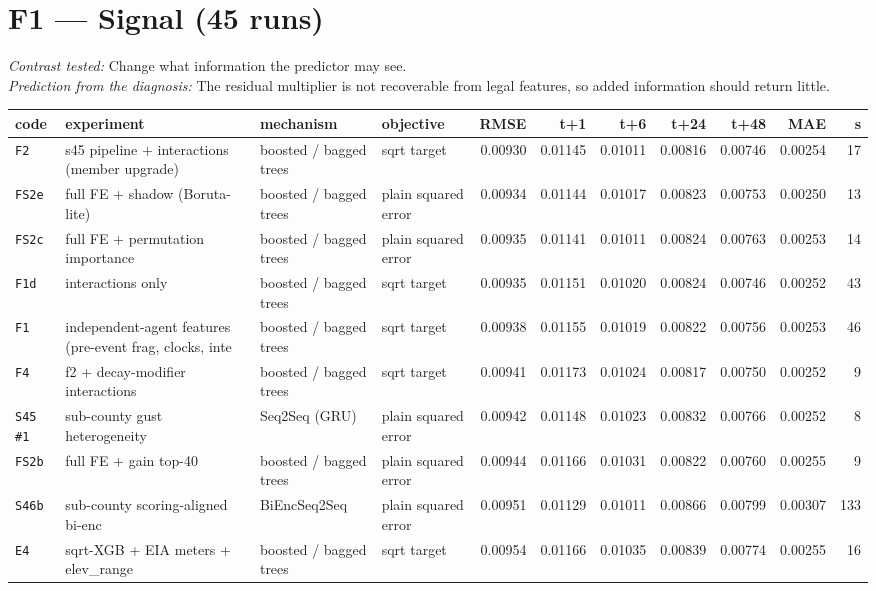 \documentclass[9pt,landscape]{article}
\begin{document}
\section*{F1 --- Signal (45 runs)}
\noindent\emph{Contrast tested:} Change what information the predictor may see.\\
\emph{Prediction from the diagnosis:} The residual multiplier is not recoverable from legal features, so added information should return little.
\vspace{2pt}
\begin{longtable}{@{}p{1.1cm}p{5.4cm}p{3.1cm}p{2.7cm}rrrrrrr@{}}
\toprule code & experiment & mechanism & objective & RMSE & t+1 & t+6 & t+24 & t+48 & MAE & s \\ \midrule \endhead
\rowcolor{gray!15}\texttt{F2} & s45 pipeline + interactions (member upgrade) & boosted / bagged trees & sqrt target & 0.00930 & 0.01145 & 0.01011 & 0.00816 & 0.00746 & 0.00254 & 17 \\
\texttt{FS2e} & full FE + shadow (Boruta-lite) & boosted / bagged trees & plain squared error & 0.00934 & 0.01144 & 0.01017 & 0.00823 & 0.00753 & 0.00250 & 13 \\
\texttt{FS2c} & full FE + permutation importance & boosted / bagged trees & plain squared error & 0.00935 & 0.01141 & 0.01011 & 0.00824 & 0.00763 & 0.00253 & 14 \\
\texttt{F1d} & interactions only & boosted / bagged trees & sqrt target & 0.00935 & 0.01151 & 0.01020 & 0.00824 & 0.00746 & 0.00252 & 43 \\
\texttt{F1} & independent-agent features (pre-event frag, clocks, inte & boosted / bagged trees & sqrt target & 0.00938 & 0.01155 & 0.01019 & 0.00822 & 0.00756 & 0.00253 & 46 \\
\texttt{F4} & f2 + decay-modifier interactions & boosted / bagged trees & sqrt target & 0.00941 & 0.01173 & 0.01024 & 0.00817 & 0.00750 & 0.00252 & 9 \\
\texttt{S45 \#1} & sub-county gust heterogeneity & Seq2Seq (GRU) & plain squared error & 0.00942 & 0.01148 & 0.01023 & 0.00832 & 0.00766 & 0.00252 & 8 \\
\texttt{FS2b} & full FE + gain top-40 & boosted / bagged trees & plain squared error & 0.00944 & 0.01166 & 0.01031 & 0.00822 & 0.00760 & 0.00255 & 9 \\
\texttt{S46b} & sub-county scoring-aligned bi-enc & BiEncSeq2Seq & plain squared error & 0.00951 & 0.01129 & 0.01011 & 0.00866 & 0.00799 & 0.00307 & 133 \\
\texttt{E4} & sqrt-XGB + EIA meters + elev\_range & boosted / bagged trees & sqrt target & 0.00954 & 0.01166 & 0.01035 & 0.00839 & 0.00774 & 0.00255 & 16 \\

\end{longtable}
\end{document}
